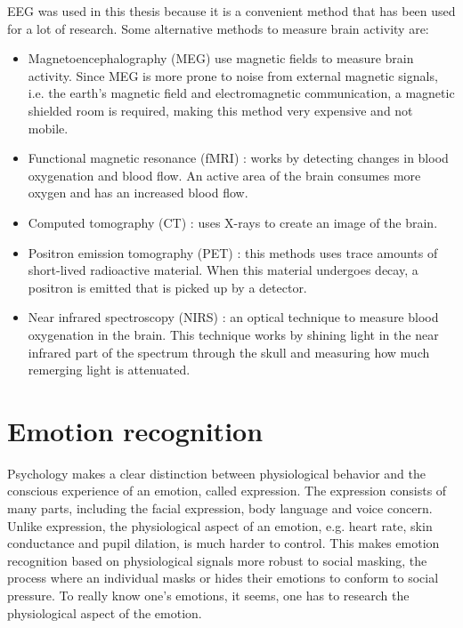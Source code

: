 EEG was used in this thesis because it is a convenient method that has been used for a lot of research. Some alternative methods to measure brain activity are:
\begin{itemize}

\item Magnetoencephalography (MEG) use magnetic fields to measure brain activity\citep{meg}. Since MEG is more prone to noise from external magnetic signals, i.e. the earth's magnetic field and electromagnetic communication, a magnetic shielded room is required, making this method very expensive and not mobile.


\item Functional magnetic resonance (fMRI) \citep{fMRI}: works by detecting changes in blood oxygenation and blood flow. An active area of the brain consumes more oxygen and has an increased blood flow.

\item Computed tomography (CT) \citep{CT}: uses X-rays to create an image of the brain. 

\item Positron emission tomography (PET) \citep{PET}: this methods uses trace amounts of short-lived radioactive material. When this material undergoes decay, a positron is emitted that is picked up by a detector.

\item Near infrared spectroscopy (NIRS) \citep{NIRS}: an optical technique to measure blood oxygenation in the brain. This technique works by shining light in the near infrared part of the spectrum through the skull and measuring how much remerging light is attenuated.

\end{itemize} 

\section{Emotion recognition}

Psychology makes a clear distinction between physiological behavior and the conscious experience of an emotion, called expression\cite{ExtendedPaper}. The expression consists of many parts, including the facial expression, body language and voice concern\citep{EMSpeech}. Unlike expression, the physiological aspect of an emotion, e.g. heart rate, skin conductance and pupil dilation, is much harder to control. This makes emotion recognition based on physiological signals more robust to social masking\citep{PhytoEm}, the process where an individual masks or hides their emotions to conform to social pressure. To really know one's emotions, it seems, one has to research the physiological aspect of the emotion.


